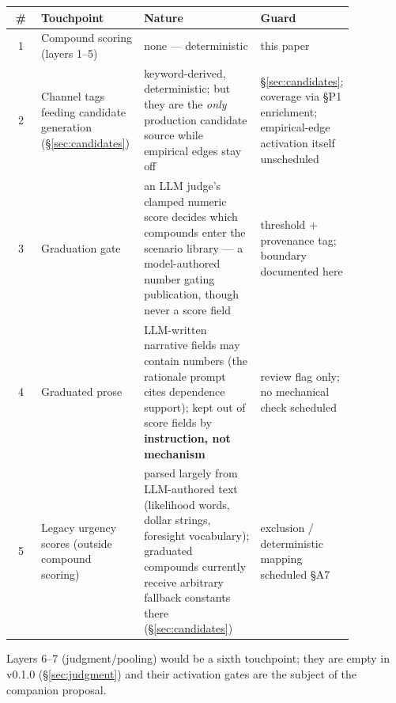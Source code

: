 \documentclass[11pt]{article}
\begin{document}
\begin{center}\small
\begin{tabular}{@{}cp{0.30\linewidth}p{0.34\linewidth}p{0.22\linewidth}@{}}
\toprule
\# & Touchpoint & Nature & Guard \\
\midrule
1 & Compound scoring (layers 1--5) & none --- deterministic & this paper \\
2 & Channel tags feeding candidate generation (\S\ref{sec:candidates}) &
keyword-derived, deterministic; but they are the \emph{only} production
candidate source while empirical edges stay off & \S\ref{sec:candidates};
coverage via \S P1 enrichment; empirical-edge activation itself
unscheduled \\
3 & Graduation gate & an LLM judge's clamped numeric score decides which
compounds enter the scenario library --- a model-authored number gating
publication, though never a score field & threshold + provenance tag;
boundary documented here \\
4 & Graduated prose & LLM-written narrative fields may contain numbers (the
rationale prompt cites dependence support); kept out of score fields by
\textbf{instruction, not mechanism} & review flag only; no mechanical check
scheduled \\
5 & Legacy urgency scores (outside compound scoring) & parsed largely from
LLM-authored text (likelihood words, dollar strings, foresight vocabulary);
graduated compounds currently receive arbitrary fallback constants there
(\S\ref{sec:candidates}) & exclusion / deterministic mapping scheduled
\S A7 \\
\bottomrule
\end{tabular}
\end{center}

Layers 6--7 (judgment/pooling) would be a sixth touchpoint; they are empty
in v0.1.0 (\S\ref{sec:judgment}) and their activation gates are the subject
of the companion proposal.
\end{document}

